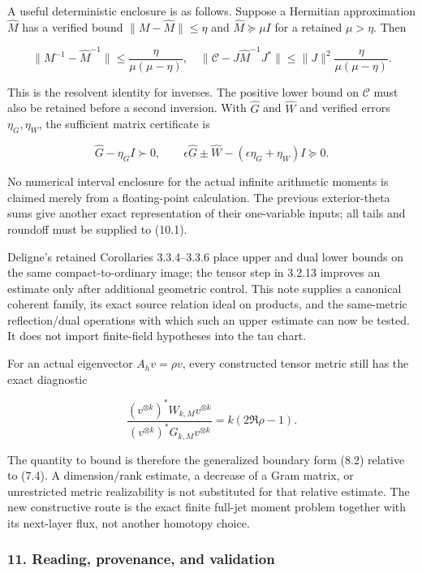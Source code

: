 A useful deterministic enclosure is as follows. Suppose a Hermitian
approximation \(\widehat M\) has a verified bound
\(\|M-\widehat M\|\le\eta\) and \(\widehat M\succeq\mu I\) for a
retained \(\mu>\eta\). Then

\[\|M^{-1}-\widehat M^{-1}\|\le\frac{\eta}{\mu(\mu-\eta)},\quad
\|\mathcal C-J\widehat M^{-1}J^*\|\le\|J\|^2\frac{\eta}{\mu(\mu-\eta)}.\tag{10.1}\]

This is the resolvent identity for inverses. The positive lower bound on
\(\mathcal C\) must also be retained before a second inversion. With
\(\widehat G\) and \(\widehat W\) and verified errors \(\eta_G,\eta_W\),
the sufficient matrix certificate is

\[\widehat G-\eta_GI\succ0,\qquad
\epsilon\widehat G\pm\widehat W-(\epsilon\eta_G+\eta_W)I\succeq0.\tag{10.2}\]

No numerical interval enclosure for the actual infinite arithmetic
moments is claimed merely from a floating-point calculation. The
previous exterior-theta sums give another exact representation of their
one-variable inputs; all tails and roundoff must be supplied to (10.1).

Deligne's retained Corollaries 3.3.4--3.3.6 place upper and dual lower
bounds on the same compact-to-ordinary image; the tensor step in 3.2.13
improves an estimate only after additional geometric control. This note
supplies a canonical coherent family, its exact source relation ideal on
products, and the same-metric reflection/dual operations with which such
an upper estimate can now be tested. It does not import finite-field
hypotheses into the tau chart.

For an actual eigenvector \(A_hv=\rho v\), every constructed tensor
metric still has the exact diagnostic

\[\frac{(v^{\otimes k})^*W_{k,M}v^{\otimes k}}
{(v^{\otimes k})^*G_{k,M}v^{\otimes k}}
=k(2\Re\rho-1).\tag{10.3}\]

The quantity to bound is therefore the generalized boundary form (8.2)
relative to (7.4). A dimension/rank estimate, a decrease of a Gram
matrix, or unrestricted metric realizability is not substituted for that
relative estimate. The new constructive route is the exact finite
full-jet moment problem together with its next-layer flux, not another
homotopy choice.

\subsubsection{11. Reading, provenance, and
validation}\label{pr_14:reading-provenance-and-validation}

